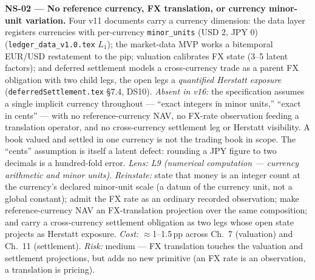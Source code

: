 \documentclass[11pt]{article}
\begin{document}
\textbf{NS-02 --- No reference currency, FX translation, or currency minor-unit variation.}
Four v11 documents carry a currency dimension: the data layer registers currencies with
per-currency \texttt{minor\_units} (USD 2, JPY 0) (\texttt{ledger\_data\_v1.0.tex} $L_1$);
the market-data MVP works a bitemporal EUR/USD restatement to the pip; valuation calibrates FX
state (3--5 latent factors); and deferred settlement models a cross-currency trade as a parent
FX obligation with two child legs, the open legs a \emph{quantified Herstatt exposure}
(\texttt{deferredSettlement.tex} \S7.4, DS10). \emph{Absent in v16:} the specification assumes a
single implicit currency throughout --- ``exact integers in minor units,'' ``exact in cents''
--- with no reference-currency NAV, no FX-rate observation feeding a translation operator, and
no cross-currency settlement leg or Herstatt visibility. A book valued and settled in one
currency is not the trading book in scope. The ``cents'' assumption is itself a latent defect:
rounding a JPY figure to two decimals is a hundred-fold error. \emph{Lens: L9 (numerical
computation --- currency arithmetic and minor units).} \emph{Reinstate:} state that money is an
integer count at the currency's declared minor-unit scale (a datum of the currency unit, not a
global constant); admit the FX rate as an ordinary recorded observation; make reference-currency
NAV an FX-translation projection over the same composition; and carry a cross-currency
settlement obligation as two legs whose open state projects as Herstatt exposure. \emph{Cost:}
$\approx$1--1.5\,pp across Ch.~7 (valuation) and Ch.~11 (settlement). \emph{Risk:} medium ---
FX translation touches the valuation and settlement projections, but adds no new primitive (an
FX rate is an observation, a translation is pricing).
\end{document}
